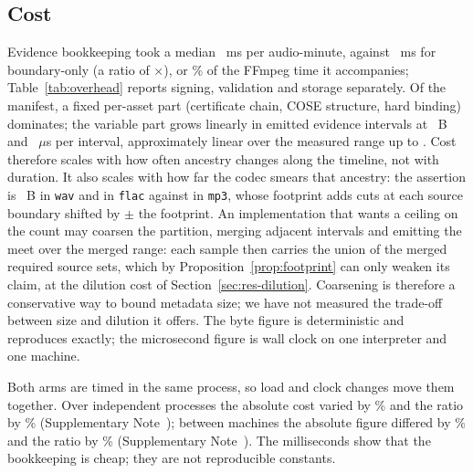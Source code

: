 \documentclass[preprint,3p,11pt,authoryear]{elsarticle}
\begin{document}
\subsection{Cost}
\label{sec:res-overhead}

Evidence bookkeeping took a median \Gem{}~ms per audio-minute, against
\Gbase{}~ms for boundary-only (a ratio of \Gratio{}$\times$), or \GffmpegPct{}\% of
the FFmpeg time it accompanies; Table~\ref{tab:overhead} reports signing,
validation and storage separately. Of the manifest, a fixed per-asset part
(certificate chain, COSE structure, hard binding) dominates; the variable
part grows linearly in emitted evidence intervals at \GperInterval{}~B and
\GperIntervalUs{}~$\mu$s per interval, approximately linear over the measured range up to \GmaxIntervals{}. Cost
therefore scales with how often ancestry changes along the timeline, not with
duration. It also scales with how far the codec smears that ancestry: the
assertion is \FassertionWav{}~B in \texttt{wav} and \FassertionFlac{} in
\texttt{flac} against \FassertionMpThree{} in \texttt{mp3}, whose footprint adds cuts at each source boundary shifted by $\pm$ the
footprint. An implementation that wants a ceiling on the count may coarsen the
partition, merging adjacent intervals and emitting the meet over the merged
range: each sample then carries the union of the merged required source sets,
which by Proposition~\ref{prop:footprint} can only weaken its claim, at the
dilution cost of Section~\ref{sec:res-dilution}. Coarsening is therefore a
conservative way to bound metadata size; we have not measured the trade-off
between size and dilution it offers. The byte figure is deterministic and reproduces exactly; the
microsecond figure is wall clock on one interpreter and one machine.

Both arms are timed in the same process, so load and clock changes move them
together. Over \MstabRepeats{} independent processes the absolute cost varied by
\MstabAbsPct{}\% and the ratio by \MstabRatioPct{}\% (Supplementary
Note~\NoteRawRows{}); between machines the absolute figure differed by
\IRabsGap{}\% and the ratio by \IRratioGap{}\% (Supplementary Note~\NoteIndependent{}).
The milliseconds show that the bookkeeping is cheap; they are not reproducible
constants.


\begin{table}[!tp]
\centering
\caption{Cost, as medians over \Greps{} repetitions on one machine. These are
measurements of a Python reference implementation, not language-independent
constants.}
\label{tab:overhead}
\small

\end{table}
\end{document}
